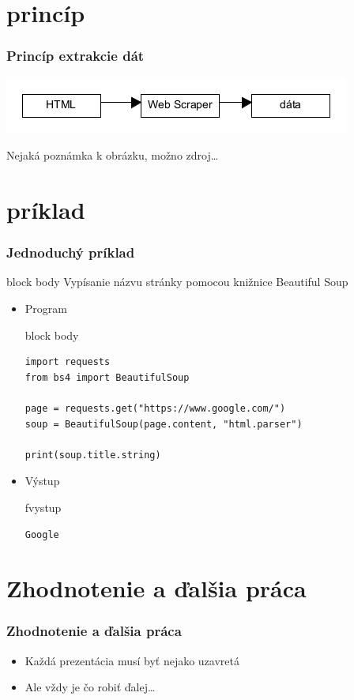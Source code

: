 \documentclass{beamer}
\newenvironment{program}{\begin{beamercolorbox}[rounded=true,shadow=true]{block body}\vspace{-4mm}}{\vspace{-2mm}\end{beamercolorbox}}
\newenvironment{vystup}{\begin{beamercolorbox}[rounded=true,shadow=true]{fvystup}}{\end{beamercolorbox}}
\newenvironment{poznamka}{\begin{beamercolorbox}[rounded=true,shadow=false]{block body}}{\end{beamercolorbox}}
\begin{document}
\section{princíp}
\begin{frame}[fragile=singleslide]\frametitle{Princíp extrakcie dát}
\includegraphics[scale=0.75]{diag.png}

{\tiny Nejaká poznámka k obrázku, možno zdroj\ldots}
\end{frame}

\section{príklad}
\begin{frame}[fragile=singleslide]\frametitle{Jednoduchý príklad}
\begin{poznamka}
Vypísanie názvu stránky pomocou knižnice Beautiful Soup
\end{poznamka}

\begin{itemize}
\item Program

\begin{program}
\begin{lstlisting}
import requests
from bs4 import BeautifulSoup

page = requests.get("https://www.google.com/")
soup = BeautifulSoup(page.content, "html.parser")

print(soup.title.string)
\end{lstlisting}
\end{program}

\item Výstup
\begin{vystup}
\begin{lstlisting}
Google
\end{lstlisting}
\end{vystup}

\end{itemize}
\end{frame}



\section*{Zhodnotenie a ďalšia práca}

\begin{frame}[fragile=singleslide]\frametitle{Zhodnotenie a ďalšia práca}
\begin{itemize}
\item Každá prezentácia musí byť nejako uzavretá
\item Ale vždy je čo robiť ďalej\ldots{}
\end{itemize}
\end{frame}
\end{document}
